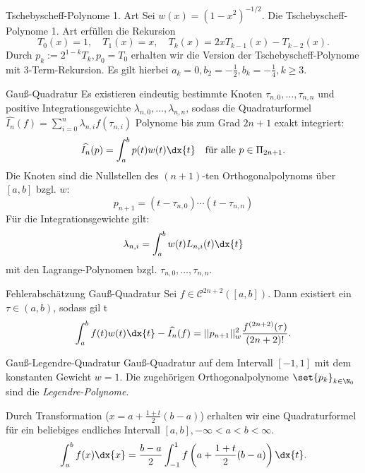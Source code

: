 \begin{karte}{Tschebyscheff-Polynome 1. Art}
    Sei \( w(x) = (1-x^2)^{-1/2} \). 
    Die Tschebyscheff-Polynome 1. Art erfüllen die Rekursion 
    \[ T_0(x) = 1, \quad T_1(x) = x, \quad T_k(x) = 2x T_{k-1}(x) - T_{k-2}(x). \]
    Durch \( p_k := 2^{1-k}T_k, p_0 = T_0 \) erhalten wir die Version der 
    Tschebyscheff-Polynome mit 3-Term-Rekursion. 
    Es gilt hierbei \( a_k = 0, b_2 = -\frac{1}{2}, b_k = -\frac{1}{4}, k \geq 3 \).
\end{karte}

\begin{karte}{Gauß-Quadratur}
    Es existieren eindeutig bestimmte Knoten \( \tau_{n,0}, \ldots, \tau_{n,n} \) 
    und positive Integrationsgewichte \( \lambda_{n,0}, \ldots, \lambda_{n,n} \), 
    sodass die Quadraturformel \( \widehat{I_n}(f) = \sum_{i=0}^n \lambda_{n,i}f(\tau_{n,i}) \)
    Polynome bis zum Grad \( 2n+1 \) exakt integriert:
    \[ \widehat{I_n}(p) = \int_a^b p(t) w(t) \dx{t} \quad \text{für alle } p \in \Pi_{2n+1}. \]
    Die Knoten sind die Nullstellen des \( (n+1) \)-ten Orthogonalpolynoms über 
    \( [a,b] \) bzgl. \(w\): 
    \[ p_{n+1} = (t - \tau_{n,0})\cdots (t - \tau_{n,n}) \] 
    Für die Integrationsgewichte gilt: 
    \[ \lambda_{n,i} = \int_a^b w(t) L_{n,i}(t) \dx{t} \]
    mit den Lagrange-Polynomen bzgl. \( \tau_{n,0}, \ldots, \tau_{n,n} \).
\end{karte}

\begin{karte}{Fehlerabschätzung Gauß-Quadratur}
    Sei \( f \in \mathcal{C}^{2n+2}([a,b]) \). Dann existiert ein \( \tau \in (a,b) \), 
    sodass gil t
    \[ \int_a^b f(t) w(t) \dx{t} - \widehat{I_n}(f) = || p_{n+1} ||_w^2 \frac{ f^{(2n+2)}(\tau) }{ (2n+2)! }. \]
\end{karte}

\begin{karte}{Gauß-Legendre-Quadratur}
    Gauß-Quadratur auf dem Intervall \( [-1,1] \) mit dem konstanten Gewicht \( w = 1 \).
    Die zugehörigen Orthogonalpolynome \( \set{p_k}_{k\in\N_0} \) sind die \textit{Legendre-Polynome}.

    Durch Transformation (\( x = a + \frac{1+t}{2}(b-a) \)) erhalten wir eine Quadraturformel für ein beliebiges endliches 
    Intervall \( [a,b], -\infty < a < b < \infty \). 
    \[ \int_a^b f(x) \dx{x} = \frac{b-a}{2} \int_{-1}^1 f\left( a + \frac{ 1+t }{2}(b-a) \right) \dx{t}. \]
\end{karte}

